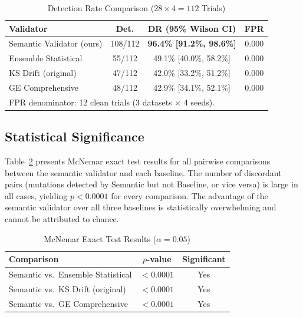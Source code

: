 \documentclass[journal]{IEEEtran}
\begin{document}
\begin{table}[!t]
\renewcommand{\arraystretch}{1.25}
\caption{Detection Rate Comparison ($28 \times 4 = 112$ Trials)}
\label{tab:main}
\centering
\small
\begin{tabular}{lccc}
\toprule
\textbf{Validator} & \textbf{Det.} & \textbf{DR (95\% Wilson CI)} & \textbf{FPR} \\
\midrule
Semantic Validator (ours) & 108/112 & \textbf{96.4\% [91.2\%, 98.6\%]} & 0.000 \\
Ensemble Statistical      & 55/112  & 49.1\% [40.0\%, 58.2\%]          & 0.000 \\
KS Drift (original)       & 47/112  & 42.0\% [33.2\%, 51.2\%]          & 0.000 \\
GE Comprehensive          & 48/112  & 42.9\% [34.1\%, 52.1\%]          & 0.000 \\
\bottomrule
\multicolumn{4}{l}{\footnotesize FPR denominator: 12 clean trials (3 datasets $\times$ 4 seeds).}
\end{tabular}
\end{table}

\subsection{Statistical Significance}

Table~\ref{tab:mcnemar} presents McNemar exact test results for all
pairwise comparisons between the semantic validator and each baseline.  The
number of discordant pairs (mutations detected by Semantic but not Baseline,
or vice versa) is large in all cases, yielding $p < 0.0001$ for every
comparison.  The advantage of the semantic validator over all three baselines
is statistically overwhelming and cannot be attributed to chance.

\begin{table}[!t]
\renewcommand{\arraystretch}{1.25}
\caption{McNemar Exact Test Results ($\alpha = 0.05$)}
\label{tab:mcnemar}
\centering
\begin{tabular}{lcc}
\toprule
\textbf{Comparison} & \textbf{$p$-value} & \textbf{Significant} \\
\midrule
Semantic vs.\ Ensemble Statistical & $< 0.0001$ & Yes \\
Semantic vs.\ KS Drift (original)  & $< 0.0001$ & Yes \\
Semantic vs.\ GE Comprehensive     & $< 0.0001$ & Yes \\
\bottomrule
\end{tabular}
\end{table}
\end{document}

